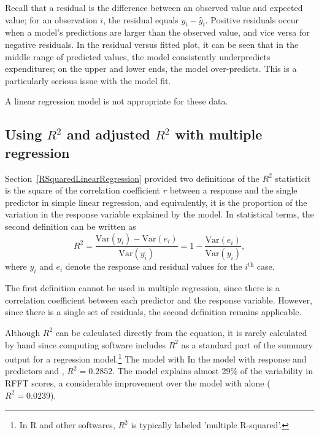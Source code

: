 \begin{example}
Recall that a residual is the difference between an observed value and expected value; for an observation $i$, the residual equals $y_i - \hat{y}_i$. Positive residuals occur when a model's predictions are larger than the observed value, and vice versa for negative residuals. In the residual versus fitted plot, it can be seen that in the middle range of predicted values, the model consistently underpredicts expenditures; on the upper and lower ends, the model over-predicts. This is a particularly serious issue with the model fit. 

A linear regression model is not appropriate for these data.	
	
\end{example}


\subsection{Using $R^2$ and adjusted $R^2$ with multiple regression}

Section~\ref{RSquaredLinearRegression} provided two definitions of the $R^2$ statistic\textemdash it is the square of the correlation coefficient $r$ between a response and the single predictor in simple linear regression, and equivalently, it is the proportion of the variation in the response variable explained by the model.  In statistical terms, the second definition can be written as 
\[
   R^2 = \frac{\text{Var}(y_i) - \text{Var}(e_i)}
   {\text{Var}(y_i)} = 1 - \frac{\text{Var}(e_i)}{\text{Var}(y_i)},
   \label{RSquareDefinition}\]
where $y_i$ and $e_i$ denote the response and residual values for the
$i^{\text{th}}$ case.

The first definition cannot be used in multiple regression, since there is a correlation coefficient between each predictor and the response variable. However, since there is a single set of residuals, the second definition remains applicable. 

Although $R^2$ can be calculated directly from the equation, it is rarely calculated by hand since computing software includes $R^2$ as a standard part of the summary output for a regression model.\footnote{In \textsf{R} and other softwares, $R^2$ is typically labeled 'multiple R-squared'.} The model with In the model with response  and predictors  and , $R^2 = 0.2852$.  The model explains almost 29\% of the variability in RFFT scores, a considerable improvement over the model with  alone ($R^2 = 0.0239$).

